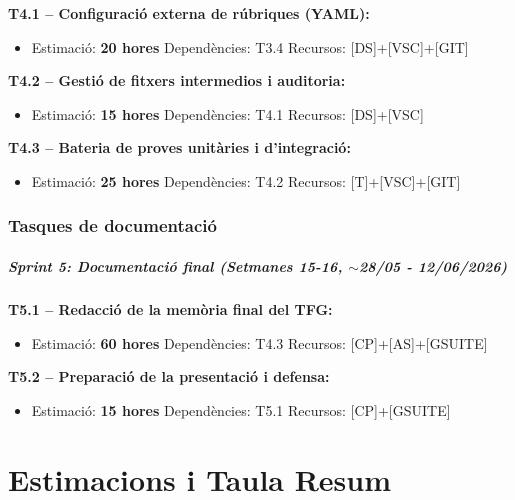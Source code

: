 \documentclass[12pt,a4paper,twoside]{report}
\begin{document}
\textbf{T4.1 -- Configuraci\'o externa de r\'ubriques (YAML):}
\begin{itemize}
    \item Estimaci\'o: \textbf{20 hores} \quad Depend\`encies: T3.4 \quad Recursos: [DS]+[VSC]+[GIT]
\end{itemize}

\textbf{T4.2 -- Gesti\'o de fitxers intermedios i auditoria:}
\begin{itemize}
    \item Estimaci\'o: \textbf{15 hores} \quad Depend\`encies: T4.1 \quad Recursos: [DS]+[VSC]
\end{itemize}

\textbf{T4.3 -- Bateria de proves unit\`aries i d'integraci\'o:}
\begin{itemize}
    \item Estimaci\'o: \textbf{25 hores} \quad Depend\`encies: T4.2 \quad Recursos: [T]+[VSC]+[GIT]
\end{itemize}

\subsection{Tasques de documentaci\'o}
\label{subsec:tasques-doc}

\paragraph{Sprint 5: Documentaci\'o final (Setmanes 15-16, $\sim$28/05 - 12/06/2026)}

\textbf{T5.1 -- Redacci\'o de la mem\`oria final del TFG:}
\begin{itemize}
    \item Estimaci\'o: \textbf{60 hores} \quad Depend\`encies: T4.3 \quad Recursos: [CP]+[AS]+[GSUITE]
\end{itemize}

\textbf{T5.2 -- Preparaci\'o de la presentaci\'o i defensa:}
\begin{itemize}
    \item Estimaci\'o: \textbf{15 hores} \quad Depend\`encies: T5.1 \quad Recursos: [CP]+[GSUITE]
\end{itemize}

\chapter{Estimacions i Taula Resum}
\label{chap:estimacions}
\end{document}
